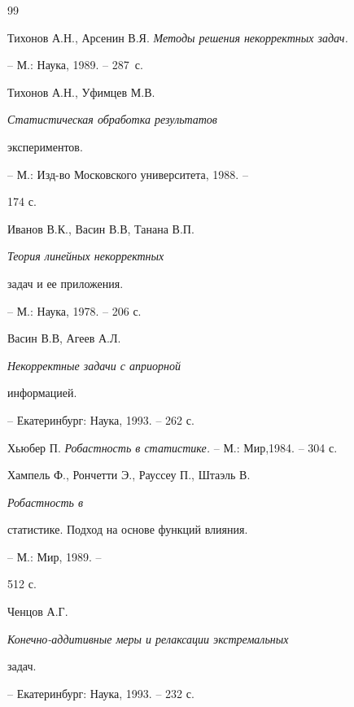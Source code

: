 \begin{thebibliography}{99}







Тихонов А.Н., Арсенин В.Я. {\em Методы решения некорректных задач.}


-- М.: Наука, 1989. -- 287~с.







Тихонов А.Н., Уфимцев М.В. {\em Статистическая обработка результатов


экспериментов.} -- М.: Изд-во Московского университета, 1988. --


174 с.







Иванов В.К., Васин В.В, Танана В.П. {\em Теория линейных некорректных


задач и ее приложения.} -- М.: Наука, 1978. -- 206 с.







Васин В.В, Агеев А.Л. {\em Некорректные задачи с априорной


информацией.} -- Екатеринбург: Наука, 1993. -- 262 с.







Хьюбер П. {\em Робастность в статистике.} -- М.: Мир,1984. -- 304 с.







Хампель Ф., Рончетти Э., Рауссеу П., Штаэль В. {\em Робастность в


статистике. Подход на основе функций влияния.} -- М.: Мир, 1989. --


512 с.







Ченцов А.Г. {\em Конечно-аддитивные меры и релаксации экстремальных


задач.} -- Екатеринбург: Наука, 1993. -- 232 с.








\end{thebibliography}
